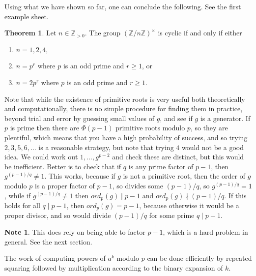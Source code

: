 \documentclass{article}
\newcommand{\Z}{\mathbb{Z}}
\newcommand{\rb}[1]{\left( #1 \right)}
\newcommand{\unit}[1]{\rb{\Z / #1\Z}^\times}
\theoremstyle{definition}\newtheorem{definition}{Definition}
\theoremstyle{definition}\newtheorem{remark}[definition]{Remark}
\theoremstyle{definition}\newtheorem*{example}{Example}
\theoremstyle{definition}\newtheorem*{note}{Note}
\newtheorem{theorem}[definition]{Theorem}
\begin{document}
Using what we have shown so far, one can conclude the following. See the first example sheet.

\begin{theorem}
Let $ n \in \Z_{> 0} $. The group $ \unit{n} $ is cyclic if and only if either
\begin{enumerate}
\item $ n = 1, 2, 4 $,
\item $ n = p^r $ where $ p $ is an odd prime and $ r \ge 1 $, or
\item $ n = 2p^r $ where $ p $ is an odd prime and $ r \ge 1 $.
\end{enumerate}
\end{theorem}


Note that while the existence of primitive roots is very useful both theoretically and computationally, there is no simple procedure for finding them in practice, beyond trial and error by guessing small values of $ g $, and see if $ g $ is a generator. If $ p $ is prime then there are $ \Phi\rb{p - 1} $ primitive roots modulo $ p $, so they are plentiful, which means that you have a high probability of success, and so trying $ 2, 3, 5, 6, \dots $ is a reasonable strategy, but note that trying $ 4 $ would not be a good idea. We could work out $ 1, \dots, g^{p - 2} $ and check these are distinct, but this would be inefficient. Better is to check that if $ q $ is any prime factor of $ p - 1 $, then $ g^{\rb{p - 1} / q} \ne 1 $. This works, because if $ g $ is not a primitive root, then the order of $ g $ modulo $ p $ is a proper factor of $ p - 1 $, so divides some $ \rb{p - 1} / q $, so $ g^{\rb{p - 1} / q} = 1 $, while if $ g^{\rb{p - 1} / q} \ne 1 $ then $ ord_p\rb{g} \mid p - 1 $ and $ ord_p\rb{g} \nmid \rb{p - 1} / q $. If this holds for all $ q \mid p - 1 $, then $ ord_p\rb{g} = p - 1 $, because otherwise it would be a proper divisor, and so would divide $ \rb{p - 1} / q $ for some prime $ q \mid p - 1 $.

\begin{note}
This does rely on being able to factor $ p - 1 $, which is a hard problem in general. See the next section.
\end{note}

The work of computing powers of $ a^k $ modulo $ p $ can be done efficiently by repeated squaring followed by multiplication according to the binary expansion of $ k $.
\end{document}
